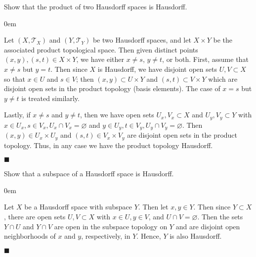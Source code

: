 \documentclass[12pt]{article}
\renewcommand{\qed}{\hfill$\blacksquare$}
\renewenvironment{proof}{\begin{addmargin}[1em]{0em}\begin{newproof}}{\end{newproof}\end{addmargin}\qed}
\newenvironment{problem}[2][Exercise]{\begin{trivlist}
\item[\hskip \labelsep {\bfseries #1}\hskip \labelsep {\bfseries #2.}]}{\end{trivlist}}
\begin{document}
\begin{problem}{17.11}
Show that the product of two Hausdorff spaces is Hausdorff.
\end{problem}
\begin{proof}
Let $\left(X,\mathcal{T}_X\right)$ and $\left(Y,\mathcal{T}_Y\right)$ be two Hausdorff spaces, and let $X\times Y$ be the associated product topological space. Then given distinct points $\left(x,y\right), \left(s,t\right) \in X\times Y$, we have either $x\neq s$, $y\neq t$, or both. First, assume that $x\neq s$ but $y=t$. Then since $X$ is Hausdorff, we have disjoint open sets $U,V\subset X$ so that $x\in U$ and $s\in V$; then $\left(x,y\right) \subset U\times Y$ and $\left(s,t\right)\subset V\times Y$ which are disjoint open sets in the product topology (basis elements). The case of $x=s$ but $y\neq t$ is treated similarly. 

Lastly, if $x\neq s$ and $y\neq t$, then we have open sets $U_x, V_x \subset X$ and $U_y,V_y \subset Y$ with $x \in U_x, s\in V_x, U_x \cap V_x = \varnothing$ and $y \in U_y, t\in V_y, U_y\cap V_y = \varnothing$. Then $\left(x,y\right) \in U_x \times U_y $ and $\left(s,t\right) \in V_x \times V_y $ are disjoint open sets in the product topology. Thus, in any case we have the product topology Hausdorff.
\end{proof}


\begin{problem}{17.12}
Show that a subspace of a Hausdorff space is Hausdorff.
\end{problem}
\begin{proof}
Let $X$ be a Hausdorff space with subspace $Y$. Then let $x,y \in Y$. Then since $Y\subset X$, there are open sets $U,V\subset X$ with $x\in U, y\in V$, and $U \cap V = \varnothing$. Then the sets $Y\cap U$ and $Y\cap V$ are open in the subspace topology on $Y$ and are disjoint open neighborhoods of $x$ and $y$, respectively, in $Y$. Hence, $Y$ is also Hausdorff. 
\end{proof}
\end{document}

